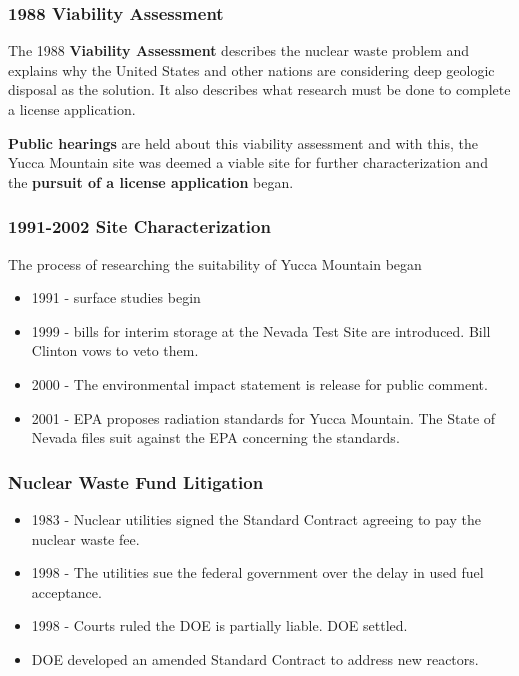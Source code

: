 
\begin{frame}[ctb!]
    \frametitle{1988 Viability Assessment}

    The 1988 \textbf{Viability Assessment} describes the nuclear waste problem and 
    explains why the United States and other nations are considering deep 
    geologic disposal as the solution. It also describes what research must be 
    done to complete a license application.

    \textbf{Public hearings} are held about this viability assessment and with this, the 
    Yucca Mountain site was deemed a viable site for further characterization 
    and the \textbf{pursuit of a license application} began. 

  \end{frame}

\begin{frame}[ctb!]
    \frametitle{1991-2002 Site Characterization}
    The process of researching the suitability of Yucca Mountain began 
    \begin{itemize}
      \item 1991 - surface studies begin 
      \item 1999 - bills for interim storage at the Nevada Test Site are 
        introduced. Bill Clinton vows to veto them.
      \item 2000 - The environmental impact statement is release for public 
        comment.
      \item 2001 - EPA proposes radiation standards for Yucca Mountain. The 
        State of Nevada files suit against the EPA concerning the standards.
    \end{itemize}
  \end{frame}

\begin{frame}[ctb!]
\frametitle{Nuclear Waste Fund Litigation}
    \begin{itemize}
    \item 1983 - Nuclear utilities signed the Standard Contract agreeing to pay the nuclear waste fee.
    \item 1998 - The utilities sue the federal government over the delay in used fuel acceptance.
    \item 1998 - Courts ruled the DOE is partially liable. DOE settled. 
    \item DOE developed an amended Standard Contract \cite{doe_standard_????} to 
      address new reactors.
  \end{itemize}
\end{frame}

